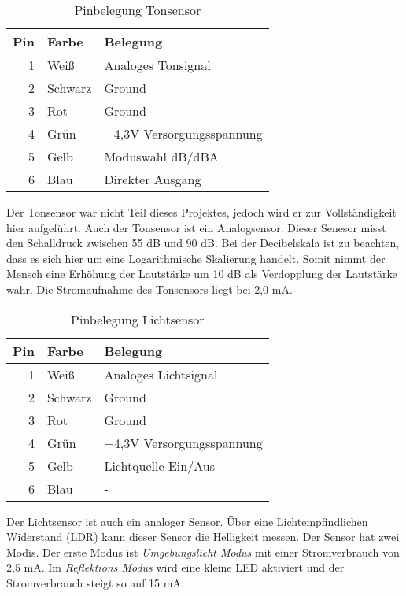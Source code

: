 \begin{table}[!ht]
\centering
\rmfamily
\caption{Pinbelegung Tonsensor}
\renewcommand{\arraystretch}{1.1}
\sffamily
\begin{footnotesize}
\begin{tabular}{r | l l}
\toprule
\textbf{Pin} & \textbf{Farbe}  & \textbf{Belegung}\\
\midrule
1 & Weiß & Analoges Tonsignal \\
2 & Schwarz & Ground \\
3 & Rot & Ground \\
4 & Grün & +4,3V Versorgungsspannung \\
5 & Gelb & Moduswahl dB/dBA \\
6 & Blau & Direkter Ausgang \\
\bottomrule
\end{tabular}
\end{footnotesize}
\label{tonsensor:tbl}
\end{table}
Der Tonsensor war nicht Teil dieses Projektes, jedoch wird er zur Vollständigkeit hier aufgeführt. Auch der Tonsensor ist ein Analogsensor. Dieser Senesor misst den Schalldruck zwischen 55 dB und 90 dB. Bei der Decibelskala ist zu beachten, dass es sich hier um eine Logarithmische Skalierung handelt. Somit nimmt der Mensch eine Erhöhung der Lautstärke um 10 dB als Verdopplung der Lautstärke wahr. Die Stromaufnahme des Tonsensors liegt bei 2,0 mA.
\begin{table}[!ht]
\centering
\rmfamily
\caption{Pinbelegung Lichtsensor}
\renewcommand{\arraystretch}{1.1}
\sffamily
\begin{footnotesize}
\begin{tabular}{r | l l}
\toprule
\textbf{Pin} & \textbf{Farbe}  & \textbf{Belegung}\\
\midrule
1 & Weiß & Analoges Lichtsignal \\
2 & Schwarz & Ground \\
3 & Rot & Ground \\
4 & Grün & +4,3V Versorgungsspannung \\
5 & Gelb & Lichtquelle Ein/Aus \\
6 & Blau & - \\
\bottomrule
\end{tabular}
\end{footnotesize}
\label{lichtsensor:tbl}
\end{table}

Der Lichtsensor ist auch ein analoger Sensor. Über eine Lichtempfindlichen Widerstand (LDR) kann dieser Sensor die Helligkeit messen. Der Sensor hat zwei Modis. Der erste Modus ist \emph{Umgebungslicht Modus} mit einer Stromverbrauch von 2,5 mA.  Im \emph{Reflektions Modus} wird eine kleine LED aktiviert und der Stromverbrauch steigt so auf 15 mA.

